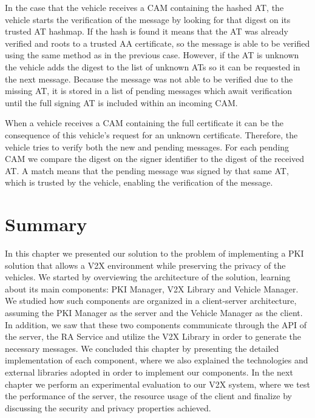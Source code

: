 In the case that the vehicle receives a CAM containing the hashed AT, the vehicle starts the verification of the message by looking for that digest on its trusted AT hashmap. If the hash is found it means that the AT was already verified and roots to a trusted AA certificate, so the message is able to be verified using the same method as in the previous case. However, if the AT is unknown the vehicle adds the digest to the list of unknown ATs so it can be requested in the next message. Because the message was not able to be verified due to the missing AT, it is stored in a list of pending messages which await verification until the full signing AT is included within an incoming CAM.

When a vehicle receives a CAM containing the full certificate it can be the consequence of this vehicle's request for an unknown certificate. Therefore, the vehicle tries to verify both the new and pending messages. For each pending CAM we compare the digest on the signer identifier to the digest of the received AT. A match means that the pending message was signed by that same AT, which is trusted by the vehicle, enabling the verification of the message.

\section{Summary}
In this chapter we presented our solution to the problem of implementing a PKI solution that allows a V2X environment while preserving the privacy of the vehicles. We started by overviewing the architecture of the solution, learning about its main components: PKI Manager, V2X Library and Vehicle Manager. We studied how such components are organized in a client-server architecture, assuming the PKI Manager as the server and the Vehicle Manager as the client. In addition, we saw that these two components communicate through the API of the server, the RA Service and utilize the V2X Library in order to generate the necessary messages. We concluded this chapter by presenting the detailed implementation of each component, where we also explained the technologies and external libraries adopted in order to implement our components. In the next chapter we perform an experimental evaluation to our V2X system, where we test the performance of the server, the resource usage of the client and finalize by discussing the security and privacy properties achieved. 

 
